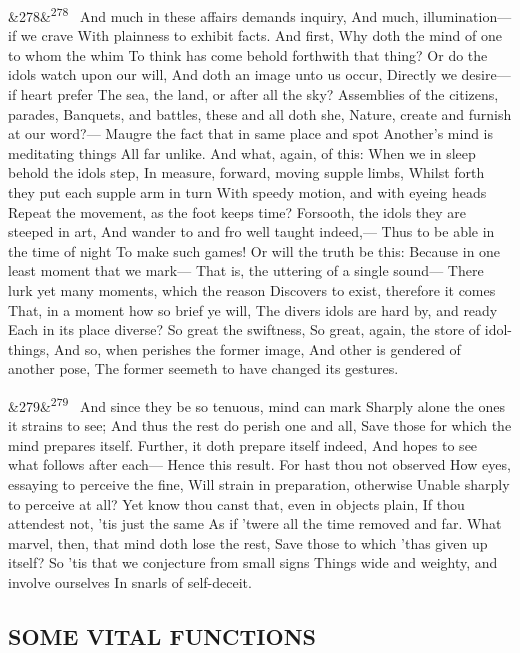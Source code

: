 \documentclass[12pt]{article}
\newcommand{\para}[1][]{\par\noindent\ifx&#1&\else\textsuperscript{\footnotesize #1}~\fi}
\begin{document}
\para[278] And much in these affairs demands inquiry, And much, illumination---if we crave With plainness to exhibit facts. And first, Why doth the mind of one to whom the whim To think has come behold forthwith that thing? Or do the idols watch upon our will, And doth an image unto us occur, Directly we desire---if heart prefer The sea, the land, or after all the sky? Assemblies of the citizens, parades, Banquets, and battles, these and all doth she, Nature, create and furnish at our word?--- Maugre the fact that in same place and spot Another's mind is meditating things All far unlike. And what, again, of this: When we in sleep behold the idols step, In measure, forward, moving supple limbs, Whilst forth they put each supple arm in turn With speedy motion, and with eyeing heads Repeat the movement, as the foot keeps time? Forsooth, the idols they are steeped in art, And wander to and fro well taught indeed,--- Thus to be able in the time of night To make such games! Or will the truth be this: Because in one least moment that we mark--- That is, the uttering of a single sound--- There lurk yet many moments, which the reason Discovers to exist, therefore it comes That, in a moment how so brief ye will, The divers idols are hard by, and ready Each in its place diverse? So great the swiftness, So great, again, the store of idol-things, And so, when perishes the former image, And other is gendered of another pose, The former seemeth to have changed its gestures.

\para[279] And since they be so tenuous, mind can mark Sharply alone the ones it strains to see; And thus the rest do perish one and all, Save those for which the mind prepares itself. Further, it doth prepare itself indeed, And hopes to see what follows after each--- Hence this result. For hast thou not observed How eyes, essaying to perceive the fine, Will strain in preparation, otherwise Unable sharply to perceive at all? Yet know thou canst that, even in objects plain, If thou attendest not, 'tis just the same As if 'twere all the time removed and far. What marvel, then, that mind doth lose the rest, Save those to which 'thas given up itself? So 'tis that we conjecture from small signs Things wide and weighty, and involve ourselves In snarls of self-deceit.

\subsection*{SOME VITAL FUNCTIONS}
\end{document}
